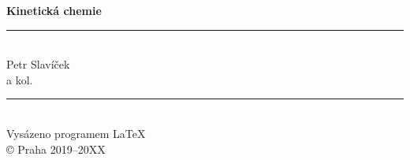 \pagestyle{empty}
\begin{titlepage}
\begin{center}
\vspace*{5cm}
{\Huge \textbf{Kinetická chemie}} \\[1cm]

\rule{0.8\textwidth}{0.02cm}\\

Petr Slavíček \\
a kol. \\
\end{center}
\vfill
\begin{flushright}
\rule{7cm}{0.01cm} \\
Vysázeno programem \LaTeX \\
\copyright \hspace{0.1cm} Praha 2019--20XX
\vspace{2cm}
\end{flushright}
\end{titlepage}